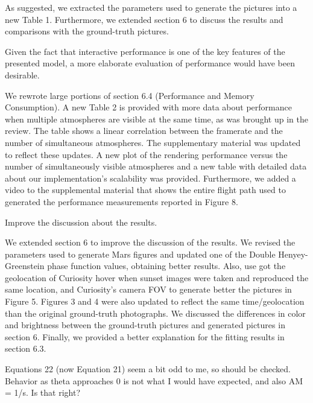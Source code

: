 \documentclass{article}
\begin{document}
As suggested, we extracted the parameters used to generate the pictures into a new Table 1. Furthermore, we extended section 6 to discuss the results and comparisons with the ground-truth pictures.
 
\vspace*{1cm}
\begin{tcolorbox}
Given the fact that interactive performance is one of the key features of the presented model, a more elaborate evaluation of performance would have been desirable.
\end{tcolorbox}

We rewrote large portions of section 6.4 (Performance and Memory Consumption). A new Table 2 is provided with more data about performance when multiple atmospheres are visible at the same time, as was brought up in the review. The table shows a linear correlation between the framerate and the number of simultaneous atmospheres.
The supplementary material was updated to reflect these updates. A new plot of the rendering performance versus the number of simultaneously visible atmospheres and a new table with detailed data about our implementation's scalability was provided.
Furthermore, we added a video to the supplemental material that shows the entire flight path used to generated the performance measurements reported in Figure 8.


\vspace*{1cm}
\begin{tcolorbox}
Improve the discussion about the results.
\end{tcolorbox}

We extended section 6 to improve the discussion of the results. We revised the parameters used to generate Mars figures and updated one of the Double Henyey-Greenstein phase function values, obtaining better results. Also, use got the geolocation of Curiosity hover when sunset images were taken and reproduced the same location, and Curiosity's camera FOV to generate better the pictures in Figure 5. Figures 3 and 4 were also updated to reflect the same time/geolocation than the original ground-truth photographs.
We discussed the differences in color and brightness between the ground-truth pictures and generated pictures in section 6.
Finally, we provided a better explanation for the fitting results in section 6.3.

\vspace*{1cm}
\begin{tcolorbox}
Equations 22 (now Equation 21) seem a bit odd to me, so should be checked. Behavior as theta approaches 0 is not what I would have expected, and also AM = 1/s. Is that right?
\end{tcolorbox}
\end{document}

